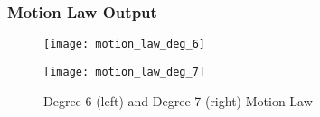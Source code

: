 \begin{frame}
	\frametitle{Motion Law Output}

	\begin{figure}[hb]
		\centering
		\begin{minipage}{0.45\textwidth}
			\texttt{[image: motion\_law\_deg\_6]}
		\end{minipage}%
		\begin{minipage}{0.45\textwidth}
			\texttt{[image: motion\_law\_deg\_7]}
		\end{minipage}%
		\caption{Degree 6 (left) and Degree 7 (right) Motion Law}
		\label{fig:motion_law_6_7}
	\end{figure}
\end{frame}
